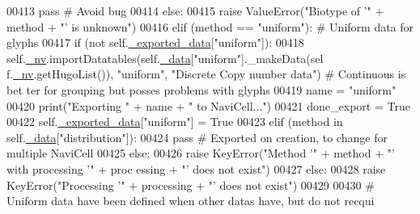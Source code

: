 \begin{DoxyCode}
00413                     \textcolor{keywordflow}{pass} \textcolor{comment}{# Avoid bug}
00414                 \textcolor{keywordflow}{else}:
00415                     \textcolor{keywordflow}{raise} ValueError(\textcolor{stringliteral}{"Biotype of '"} + method + \textcolor{stringliteral}{"' is unknown"})
00416             \textcolor{keywordflow}{elif} (method == \textcolor{stringliteral}{"uniform"}): \textcolor{comment}{# Uniform data for glyphs}
00417                 \textcolor{keywordflow}{if} (\textcolor{keywordflow}{not} self.\hyperlink{classnavicom_1_1navicom_1_1NaviCom_ab7328fbbe89a1b3cb2db8c3d456d958f}{_exported_data}[\textcolor{stringliteral}{"uniform"}]):
00418                     self.\hyperlink{classnavicom_1_1navicom_1_1NaviCom_afff3fd56fa16a68bab52ba8d801e325a}{_nv}.importDatatables(self.\hyperlink{classnavicom_1_1navicom_1_1NaviCom_a407b2b5c30a5652ee85c4be54b3e6679}{_data}[\textcolor{stringliteral}{"uniform"}].\_makeData(sel
      f.\hyperlink{classnavicom_1_1navicom_1_1NaviCom_afff3fd56fa16a68bab52ba8d801e325a}{_nv}.getHugoList()), \textcolor{stringliteral}{"uniform"}, \textcolor{stringliteral}{"Discrete Copy number data"}) \textcolor{comment}{# Continuous is bet
      ter for grouping but posses problems with glyphs}
00419                     name = \textcolor{stringliteral}{"uniform"}
00420                     \textcolor{keywordflow}{print}(\textcolor{stringliteral}{"Exporting "} + name + \textcolor{stringliteral}{" to NaviCell..."})
00421                     done\_export = \textcolor{keyword}{True}
00422                     self.\hyperlink{classnavicom_1_1navicom_1_1NaviCom_ab7328fbbe89a1b3cb2db8c3d456d958f}{_exported_data}[\textcolor{stringliteral}{"uniform"}] = \textcolor{keyword}{True}
00423             \textcolor{keywordflow}{elif} (method \textcolor{keywordflow}{in} self.\hyperlink{classnavicom_1_1navicom_1_1NaviCom_a407b2b5c30a5652ee85c4be54b3e6679}{_data}[\textcolor{stringliteral}{"distribution"}]):
00424                 \textcolor{keywordflow}{pass} \textcolor{comment}{# Exported on creation, to change for multiple NaviCell}
00425             \textcolor{keywordflow}{else}:
00426                 \textcolor{keywordflow}{raise} KeyError(\textcolor{stringliteral}{"Method '"} + method + \textcolor{stringliteral}{"' with processing '"} + proc
      essing + \textcolor{stringliteral}{"' does not exist"})
00427         \textcolor{keywordflow}{else}:
00428             \textcolor{keywordflow}{raise} KeyError(\textcolor{stringliteral}{"Processing '"} + processing + \textcolor{stringliteral}{"' does not exist"})
00429 
00430         \textcolor{comment}{# Uniform data have been defined when other datas have, but do not recqui
}
\end{DoxyCode}
